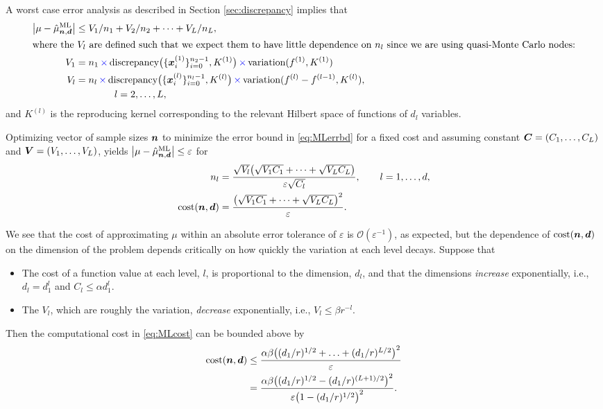 \documentclass{svproc}
\begin{document}
A worst case error analysis as described in Section \ref{sec:discrepancy} implies that
\begin{align}
    \label{eq:MLerrbd}
    \bigl \lvert \mu - \hat{\mu}^{\text{ML}}_{{\boldsymbol{n}},{\boldsymbol{d}}} \bigr \rvert &\le
    V_1/n_1 + V_2/n_2 + \cdots + V_L/n_L,  \\
    \intertext{where the $V_l$ are defined such that we expect them to have little dependence on $n_l$ since we are using quasi-Monte Carlo nodes:} 
    \nonumber
    V_1 &= n_1 \, \textcolor{blue}{\times} \, \text{discrepancy}\bigl(\{{\boldsymbol{x}}_i^{(1)}\}_{i=0}^{n_2-1}, K^{(1)} \bigr) \, \textcolor{blue}{\times} \, \text{variation}(f^{(1)}, K^{(1)})\\
    \nonumber
    V_l & = n_l \, \textcolor{blue}{\times} \, \text{discrepancy}\bigl(\{{\boldsymbol{x}}_i^{(l)}\}_{i=0}^{n_l-1}, K^{(l)} \bigr) \, \textcolor{blue}{\times} \, \text{variation}(f^{(l)} - f^{(l-1)}, K^{(l)}), \\
    \nonumber
    & \qquad \qquad l = 2, \ldots, L,
\end{align}
and $K^{(l)}$ is the reproducing kernel corresponding to the relevant  Hilbert space of functions of $d_l$ variables.  

Optimizing vector of sample sizes ${\boldsymbol{n}}$ to minimize the error bound in \eqref{eq:MLerrbd} for a fixed cost and assuming constant ${\boldsymbol{C}} = (C_1, \ldots, C_L)$ and ${\boldsymbol{V}} = (V_1, \ldots, V_L)$, yields $\bigl \lvert \mu - \hat{\mu}^{\text{ML}}_{{\boldsymbol{n}},{\boldsymbol{d}}} \bigr \rvert \le \varepsilon$ for
\begin{align}
\nonumber
    n_l & = \frac{\sqrt{V_l} \bigl(\sqrt{V_1 C_1} + \cdots + \sqrt{V_LC_L}\bigr)}{\varepsilon \sqrt{C_l} }, \qquad l = 1, \ldots, d,\\
    \text{cost}({\boldsymbol{n}},{\boldsymbol{d}}) & = \frac{\bigl(\sqrt{V_1 C_1} + \cdots + \sqrt{V_LC_L}\bigr)^2}{\varepsilon}. \label{eq:MLcost}
\end{align}

We see that the cost of approximating $\mu$ within an absolute error tolerance of $\varepsilon$ is $\mathcal{O}(\varepsilon^{-1})$, as expected, but the dependence of $\text{cost}({\boldsymbol{n}},{\boldsymbol{d}})$ on the dimension of the problem depends critically on how quickly the variation at each level decays.  Suppose that 
\begin{itemize}
    \item The cost of a function value at each level, $l$, is proportional to the dimension, $d_l$, and that the dimensions \emph{increase} exponentially, i.e.,  $d_l = d_1^{l}$ and $C_l \le \alpha d_1^l$. 
    \item The $V_l$, which are roughly the variation, \emph{decrease} exponentially, i.e., $V_l \le \beta r^{-l} $.
\end{itemize}   
Then the computational cost in \eqref{eq:MLcost} can be bounded above by
\begin{align*}
     \text{cost}({\boldsymbol{n}},{\boldsymbol{d}}) & \le \frac{\alpha \beta \bigl((d_1/r)^{1/2} + \ldots + (d_1/r)^{L/2}\bigr)^2}{\varepsilon} \\
     & = \frac{\alpha \beta \bigl((d_1/r)^{1/2} - (d_1/r)^{(L+1)/2}\bigr)^2}{\varepsilon \bigl( 1 - (d_1/r)^{1/2}\bigr)^2}.
\end{align*}
\end{document}
